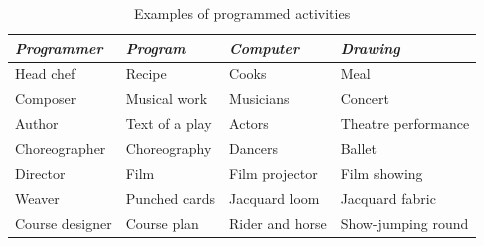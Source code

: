 \begin{table}[htbp]
\begin{center}
\small
\begin{tabular}{@{}|p{25mm}|p{30mm}|p{30mm}|p{30mm}|@{}}
\hline
{\em Programmer } & {\em Program } & {\em Computer } & {\em Drawing }  \\
\hline \hline
Head chef & Recipe & Cooks & Meal\\
Com\-pos\-er & Musical work & Mu\-si\-cians & Con\-cert \\
Au\-thor & Text of a play  & Ac\-tors & The\-a\-tre per\-for\-mance \\
Cho\-re\-og\-ra\-pher & Cho\-re\-og\-ra\-phy & Dan\-cers & Bal\-let \\
Di\-rec\-tor & Film & Film pro\-jec\-tor & Film show\-ing \\
Wea\-ver & Punched cards & Jac\-quard loom & Jac\-quard fab\-ric\\
Course de\-sign\-er & Course plan & Rider and horse & Show-jump\-ing round \\
\hline
\end{tabular}
\end{center}
\caption{Examples of programmed activities}
\end{table}

